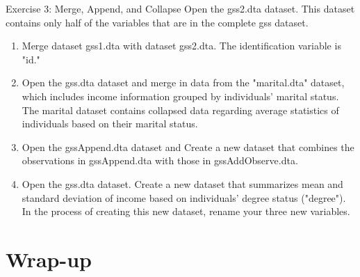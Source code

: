 \documentclass[table,smaller]{beamer}
\begin{document}
\begin{frame}[label=sec-7-3]{Exercise 3: Merge, Append, and Collapse}
Open the gss2.dta dataset. This dataset contains only half of the variables that are in the complete gss dataset. 
\begin{enumerate}
\item Merge dataset gss1.dta with dataset gss2.dta.  The identification variable is "id."
\item Open the gss.dta dataset and merge in data from the "marital.dta" dataset, which includes income information grouped by individuals' marital status.  The marital dataset contains collapsed data regarding average statistics of individuals based on their marital status.
\item Open the gssAppend.dta dataset and Create a new dataset that combines the observations in gssAppend.dta with those in gssAddObserve.dta.
\item Open the gss.dta dataset. Create a new dataset that summarizes mean and standard deviation of income based on individuals' degree status ("degree").  In the process of creating this new dataset, rename your three new variables.
\end{enumerate}
\end{frame}
\section{Wrap-up}
\label{sec-8}
\end{document}
